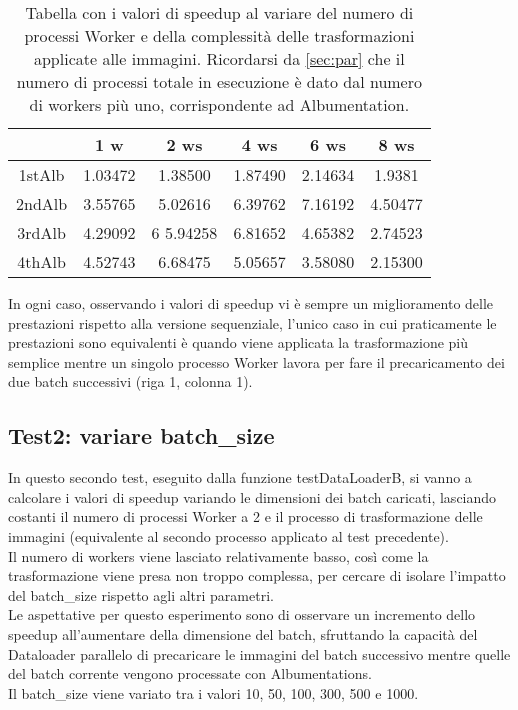 \documentclass[10pt,twocolumn,letterpaper]{article}
\begin{document}
\begin{table}[h]
\centering
\begin{tabular}{ |c|c|c|c|c|c| } 
\hline
 & 1 w & 2 ws & 4 ws & 6 ws & 8 ws\\
 \hline
1stAlb & 1.03472 & 1.38500 & 1.87490 & 2.14634 & 1.9381\\
\hline
2ndAlb & 3.55765 & 5.02616 & 6.39762 & 7.16192 & 4.50477\\
\hline
3rdAlb & 4.29092 & 6 5.94258 & 6.81652 & 4.65382 & 2.74523\\
\hline
4thAlb & 4.52743 & 6.68475 & 5.05657 & 3.58080 & 2.15300\\
\hline
\end{tabular}
\vspace*{3mm}
\caption{Tabella con i valori di speedup al variare del numero di processi Worker e della complessità delle trasformazioni applicate alle immagini. Ricordarsi da \cref{sec:par} che il numero di processi totale in esecuzione è dato dal numero di workers più uno, corrispondente ad Albumentation.}
\label{table:t1}
\end{table}

In ogni caso, osservando i valori di speedup vi è sempre un miglioramento delle prestazioni rispetto alla versione sequenziale, l'unico caso in cui praticamente le prestazioni sono equivalenti è quando viene applicata la trasformazione più semplice mentre un singolo processo Worker lavora per fare il precaricamento dei due batch successivi (riga 1, colonna 1).

\subsection{Test2: variare batch\_size}

In questo secondo test, eseguito dalla funzione testDataLoaderB, si vanno a calcolare i valori di speedup variando le dimensioni dei batch caricati, lasciando costanti il numero di processi Worker a 2 e il processo di trasformazione delle immagini (equivalente al secondo processo applicato al test precedente).\\
Il numero di workers viene lasciato relativamente basso, così come la trasformazione viene presa non troppo complessa, per cercare di isolare l'impatto del batch\_size rispetto agli altri parametri.\\
Le aspettative per questo esperimento sono di osservare un incremento dello speedup all'aumentare della dimensione del batch, sfruttando la capacità del Dataloader parallelo di precaricare le immagini del batch successivo mentre quelle del batch corrente vengono processate con Albumentations.\\
Il batch\_size viene variato tra i valori 10, 50, 100, 300, 500 e 1000.
\end{document}
